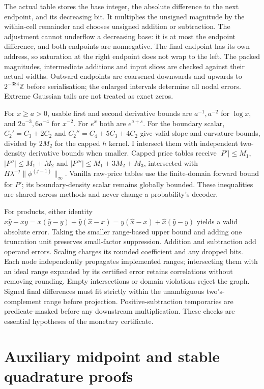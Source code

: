 \documentclass[11pt]{article}
\begin{document}
The actual table stores the base integer, the absolute difference to the
next endpoint, and its decreasing bit.  It multiplies the unsigned magnitude
by the within-cell remainder and chooses unsigned addition or subtraction.
The adjustment cannot underflow a decreasing base: it is at most the
endpoint difference, and both endpoints are nonnegative.
The final endpoint has its own address, so saturation at the right endpoint
does not wrap to the left.  The packed magnitudes, intermediate additions
and input slices are checked against their actual widths.
Outward endpoints are coarsened downwards and upwards to
$2^{-384}\mathbb Z$ before serialisation; the enlarged intervals determine
all nodal errors.  Extreme Gaussian tails are not treated as exact zeros.

For $x\geq a>0$, usable first and second derivative bounds are
$a^{-1},a^{-2}$ for $\log x$, and $2a^{-3},6a^{-4}$ for $x^{-2}$.
For $e^x$ both are $e^{a+s}$.
For the boundary scalar,
$C_2'=C_3+2C_2$ and $C_2''=C_4+5C_3+4C_2$ give valid slope and
curvature bounds, divided by $2M_2$ for the capped $h$ kernel.
I intersect them with independent two-density derivative bounds when
smaller. Capped price tables receive $|P'|\leq M_1$,
$|P''|\leq M_1+M_2$ and $|P'''|\leq M_1+3M_2+M_3$, intersected with
$H\lambda^{-j}\|\phi^{(j-1)}\|_\infty$.
Vanilla raw-price tables use the finite-domain forward bound for $P'$;
its boundary-density scalar remains globally bounded. These inequalities
are shared across methods and never change a probability's decoder.

For products, either identity
$\widehat x\widehat y-xy=x(\widehat y-y)+\widehat y(\widehat x-x)
=y(\widehat x-x)+\widehat x(\widehat y-y)$ yields a valid absolute error.
Taking the smaller range-based upper bound and adding one truncation unit
preserves small-factor suppression.  Addition and subtraction add operand
errors.  Scaling charges its rounded coefficient and any dropped bits.
Each node independently propagates implemented ranges; intersecting them
with an ideal range expanded by its certified error retains correlations
without removing rounding.  Empty intersections or domain violations reject
the graph.  Signed final differences must fit strictly within the
unambiguous two's-complement range before projection.  Positive-subtraction
temporaries are predicate-masked before any downstream multiplication.
These checks are essential hypotheses of the monetary certificate.

\section{Auxiliary midpoint and stable quadrature proofs}
\label{app:aux}
\end{document}
